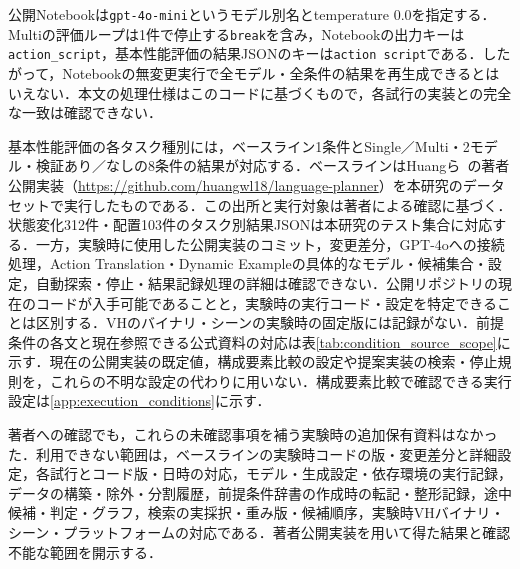 公開Notebookは\texttt{gpt-4o-mini}というモデル別名とtemperature 0.0を指定する．Multiの評価ループは1件で停止する\texttt{break}を含み，Notebookの出力キーは\texttt{action\_script}，基本性能評価の結果JSONのキーは\texttt{action script}である．したがって，Notebookの無変更実行で全モデル・全条件の結果を再生成できるとはいえない．本文の処理仕様はこのコードに基づくもので，各試行の実装との完全な一致は確認できない．

基本性能評価の各タスク種別には，ベースライン1条件とSingle／Multi・2モデル・検証あり／なしの8条件の結果が対応する．ベースラインはHuangら~\cite{huang22}の著者公開実装（\url{https://github.com/huangwl18/language-planner}）を本研究のデータセットで実行したものである．この出所と実行対象は著者による確認に基づく．状態変化312件・配置103件のタスク別結果JSONは本研究のテスト集合に対応する．一方，実験時に使用した公開実装のコミット，変更差分，GPT-4oへの接続処理，Action Translation・Dynamic Exampleの具体的なモデル・候補集合・設定，自動探索・停止・結果記録処理の詳細は確認できない．公開リポジトリの現在のコードが入手可能であることと，実験時の実行コード・設定を特定できることは区別する．VHのバイナリ・シーンの実験時の固定版には記録がない．前提条件の各文と現在参照できる公式資料の対応は表\ref{tab:condition_source_scope}に示す．現在の公開実装の既定値，構成要素比較の設定や提案実装の検索・停止規則を，これらの不明な設定の代わりに用いない．構成要素比較で確認できる実行設定は\ref{app:execution_conditions}に示す．

著者への確認でも，これらの未確認事項を補う実験時の追加保有資料はなかった．利用できない範囲は，ベースラインの実験時コードの版・変更差分と詳細設定，各試行とコード版・日時の対応，モデル・生成設定・依存環境の実行記録，データの構築・除外・分割履歴，前提条件辞書の作成時の転記・整形記録，途中候補・判定・グラフ，検索の実採択・重み版・候補順序，実験時VHバイナリ・シーン・プラットフォームの対応である．著者公開実装を用いて得た結果と確認不能な範囲を開示する．
